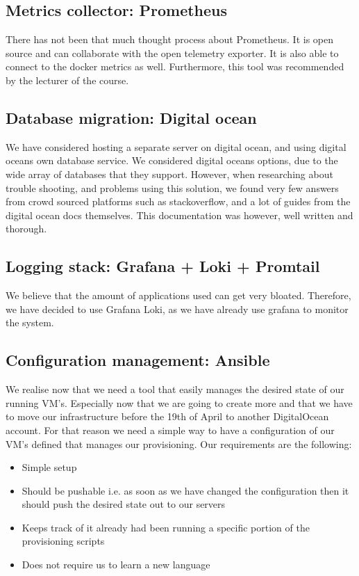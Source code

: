 \subsection{Metrics collector: Prometheus}
There has not been that much thought process about Prometheus. It is open source and can collaborate with the open telemetry exporter. It is also able to connect to the docker metrics as well. Furthermore, this tool was recommended by the lecturer of the course.

\subsection{Database migration: Digital ocean}
We have considered hosting a separate server on digital ocean, and using digital oceans own database service. We considered digital oceans options, due to the wide array of databases that they support. However, when researching about trouble shooting, and problems using this solution, we found very few answers from crowd sourced platforms such as stackoverflow, and a lot of guides from the digital ocean docs themselves. This documentation was however, well written and thorough.

\subsection{Logging stack: Grafana + Loki + Promtail} %

We believe that the amount of applications used can get very bloated. Therefore, we have decided to use Grafana Loki, as we have already use grafana to monitor the system.











\subsection{Configuration management: Ansible}
We realise now that we need a tool that easily manages the desired state of our running VM’s. Especially now that we are going to create more and that we have to move our infrastructure before the 19th of April to another DigitalOcean account. For that reason we need a simple way to have a configuration of our VM’s defined that manages our provisioning. Our requirements are the following:

\begin{itemize}
    \item Simple setup
    \item Should be pushable i.e. as soon as we have changed the configuration then it should push the desired state out to our servers
    \item Keeps track of it already had been running a specific portion of the provisioning scripts
    \item Does not require us to learn a new language
\end{itemize}

